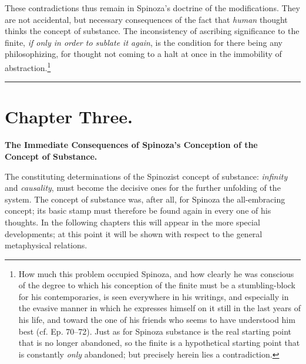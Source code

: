 \documentclass[12pt,a4paper,openany]{book}
\newcommand{\opage}[1]{\marginnote{\footnotesize\textit{[#1]}}}
\begin{document}
These contradictions thus remain in Spinoza's doctrine of the
modifications. They are not accidental, but necessary consequences of the fact
that \emph{human} thought thinks the concept of substance. The
inconsistency of ascribing significance to the finite, \emph{if only
in order to sublate it again}, is the condition for there being any philosophizing,
for thought not coming to a halt at once in the immobility of
abstraction.\footnote{How much this problem occupied
Spinoza, and how clearly he was conscious of the degree to which his
conception of the finite must be a stumbling-block for his
contemporaries, is seen everywhere in his writings, and especially in the
evasive manner in which he expresses himself on it still in the last years of his life, and
toward the one of his friends who seems to have understood him best
(cf. Ep. 70--72). Just as for Spinoza substance
is the real starting point that is no longer abandoned, so the
finite is a hypothetical starting point that is constantly \emph{only} abandoned; but
precisely herein lies a contradiction.}

\bigskip
\begin{center}\rule{2.5cm}{0.4pt}\end{center}

\newpage

\chapter*{Chapter Three.}

\begin{center}
\textbf{The Immediate Consequences of Spinoza's Conception of the\\
Concept of Substance.}
\end{center}

\opage{65}\setcounter{footnote}{0}The constituting determinations of the Spinozist concept of substance:
\emph{infinity} and \emph{causality}, must become the decisive ones for the
further unfolding of the system. The concept of substance was, after all, for Spinoza
the all-embracing concept; its basic stamp must therefore be found again in
every one of his thoughts. In the following chapters this will appear
in the more special developments; at this point it will be
shown with respect to the general metaphysical relations.
\end{document}
